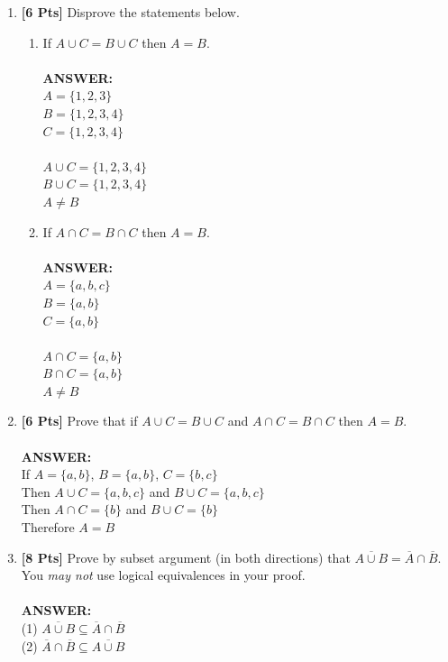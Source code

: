 \documentclass[12pt]{article}
\begin{document}
\begin{enumerate}
\clearpage
\item {\bf [6 Pts]} Disprove the statements below.
\begin{enumerate}
\item If $A \cup C = B \cup C$ then $A= B$.\\\\
\textbf{ANSWER:}\\
$A = \{ 1,2,3 \}$\\
$B = \{ 1,2,3,4 \}$\\
$C = \{ 1,2,3,4 \}$\\\\
$A \cup C = \{ 1,2,3,4 \}$\\
$B \cup C = \{ 1,2,3,4 \}$\\
$A \neq B$\\
\item If $A \cap C = B \cap C$ then $A= B$.\\\\
\textbf{ANSWER:}\\
$A = \{ a,b,c \}$\\
$B = \{ a,b \}$\\
$C = \{ a,b \}$\\\\
$A \cap C = \{ a,b \}$\\
$B \cap C = \{ a,b \}$\\
$A \neq B$\\

\end{enumerate}

\item {\bf [6 Pts]} Prove that if $A \cup C = B \cup C$ and $A \cap C = B \cap C$ then $A= B$.\\\\
\textbf{ANSWER:}\\
If $A = \{ a,b \}$, $B = \{ a,b \}$,  $C = \{ b,c \}$\\
Then $A \cup C = \{ a,b,c \}$ and $B \cup C = \{ a,b,c \}$\\
Then $A \cap C = \{ b \}$ and $B \cup C = \{ b \}$\\
Therefore $A=B$\\

\clearpage
\item {\bf [8 Pts]} Prove by subset argument (in both directions) that $\overline{A \cup B} = \overline{A} \cap \overline{B}$. 
         You {\it may not} use logical equivalences in your proof. \\\\
	\textbf{ANSWER:}\\
         (1) $\overline{A \cup B} \subseteq \overline{A} \cap \overline{B}$\\
         (2) $ \overline{A} \cap \overline{B}  \subseteq \overline{A \cup B}  $\\\\
         

\end{enumerate}
\end{document}
